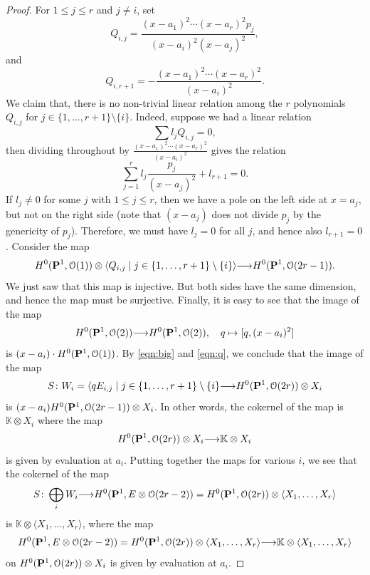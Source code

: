 \documentclass[11pt,reqno]{amsart}
\theoremstyle{plain}
\theoremstyle{definition}
\theoremstyle{remark}
\numberwithin{equation}{section}
\renewcommand{\k}{\mathbb{K}}
\renewcommand{\to}{{\longrightarrow}}
\numberwithin{equation}{section}
\renewcommand{\O}{\mathcal O}
\begin{document}
\begin{proof}
  For $1 \leq j \leq r$ and $j \neq i$, set
  \[
    Q_{i,j} = \frac{(x-a_1)^2 \cdots (x-a_r)^2p_j}{(x-a_i)^2(x-a_j)^2}, 
  \]
  and
  \[
    Q_{i,r+1} = - \frac{(x-a_1)^2 \cdots (x-a_r)^2}{(x-a_i)^2}.
  \]
  We claim that, there is no non-trivial linear relation among the $r$ polynomials $Q_{i,j}$ for $j \in \{1, \dots, r+1\} \setminus \{i\}$.
  Indeed, suppose we had a linear relation
  \[ \sum l_j Q_{i,j} = 0,\]
  then dividing throughout by $\frac{(x-a_1)^2\cdots (x-a_r)^2}{(x-a_i)^2}$ gives the relation
  \[ \sum_{j = 1}^r l_j \frac{p_j}{(x-a_j)^2} + l_{r+1} = 0.\]
  If $l_j \neq 0$ for some $j$ with $1 \leq j \leq r$, then we have a pole on the left side at $x = a_j$, but not on the right side (note that $(x-a_j)$ does not divide $p_j$ by the genericity of $p_j$).
  Therefore, we must have $l_j = 0$ for all $j$, and hence also $l_{r+1} = 0$.
  Consider the map
  \begin{equation}\label{eqn:big}
    H^0(\P^1, \O(1)) \otimes \langle  Q_{i,j} \mid j \in \{1, \dots, r+1\} \setminus \{i\}\rangle \to H^0(\P^1, \O(2r-1)).
  \end{equation}
  We just saw that this map is injective.
  But both sides have the same dimension, and hence the map must be surjective.
  Finally, it is easy to see that the image of the map
  \begin{equation}\label{eqn:q}
    H^0(\P^1, \O(2)) \to H^0(\P^1, \O(2)), \quad q \mapsto [q, (x-a_i)^2]
  \end{equation}
  is $(x-a_i)\cdot H^0(\P^1, \O(1))$.
  By \eqref{eqn:big} and \eqref{eqn:q}, we conclude that the image of the map
  \[ S \from W_i = \langle qE_{i,j} \mid j \in\{1, \dots, r+1\} \setminus \{i\} \to H^0(\P^1, \O(2r)) \otimes X_i\]
  is $(x-a_i)H^0(\P^1, \O(2r-1)) \otimes X_i$.
  In other words, the cokernel of the map is $\k \otimes X_i$ where the map
  \[H^0(\P^1, \O(2r)) \otimes X_i \to \k \otimes X_i \]
  is given by evaluation at $a_i$.
  Putting together the maps for various $i$, we see that the cokernel of the map
  \[ S \from \bigoplus_i W_i \to H^0(\P^1, E \otimes \O(2r-2)) = H^0(\P^1, \O(2r)) \otimes \langle  X_1, \dots, X_r \rangle\]
  is $\k \otimes \langle  X_1, \dots, X_r \rangle$, where the map
  \begin{equation}\label{eqn:partialsur}
    H^0(\P^1, E \otimes \O(2r-2)) = H^0(\P^1, \O(2r)) \otimes \langle  X_1, \dots, X_r \rangle \to \k \otimes \langle  X_1, \dots, X_r \rangle
  \end{equation}
  on $H^0(\P^1, \O(2r)) \otimes X_i$ is given by evaluation at $a_i$.


\end{proof}
\end{document}
